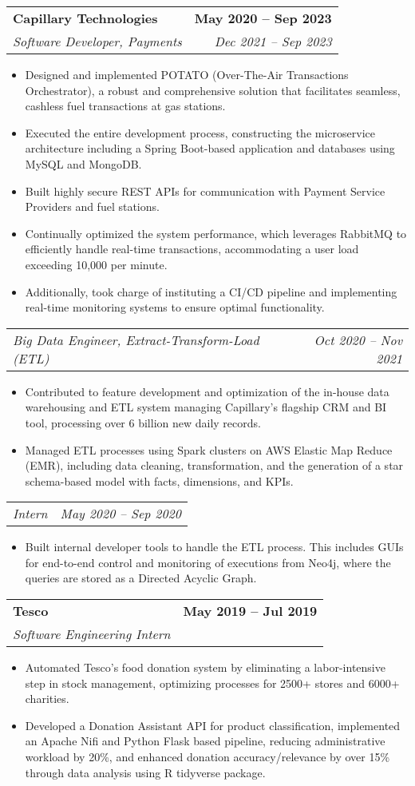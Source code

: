 \documentclass[letterpaper,11pt]{article}
\makeatletter
\newcommand{\resumeItem}[1]{
  \item\small{
    {#1 \vspace{-2pt}}
  }
}
\newcommand{\resumeSubheading}[4]{
  \vspace{-2pt}\item
    \begin{tabular*}{1.0\textwidth}[t]{l@{\extracolsep{\fill}}r}
      \textbf{#1} & \textbf{\small #2} \\
      \textit{\small#3} & \textit{\small #4} \\
    \end{tabular*}\vspace{-7pt}
}
\newcommand{\resumeSubSubheading}[2]{
    \item
    \begin{tabular*}{1.0\textwidth}{l@{\extracolsep{\fill}}r}
      \textit{\small#1} & \textit{\small #2} \\
    \end{tabular*}\vspace{-7pt}
}
\newcommand{\resumeItemListStart}{\begin{itemize}}
\newcommand{\resumeItemListEnd}{\end{itemize}\vspace{-5pt}}
\makeatother
\begin{document}
    \resumeSubheading
      {Capillary Technologies}{May 2020 -- Sep 2023}
      {Software Developer, Payments}{Dec 2021 -- Sep 2023}
      \resumeItemListStart
        \resumeItem{
        Designed and implemented POTATO (Over-The-Air Transactions Orchestrator), a robust and comprehensive solution that facilitates seamless, cashless fuel transactions at gas stations.
        }
        \resumeItem{
        Executed the entire development process, constructing the microservice architecture including a Spring Boot-based application and databases using MySQL and MongoDB.
        }
        \resumeItem{
        Built highly secure REST APIs for communication with Payment Service Providers and fuel stations.
        }
        \resumeItem{
        Continually optimized the system performance, which leverages RabbitMQ to efficiently handle real-time transactions, accommodating a user load exceeding 10,000 per minute.
        }
        \resumeItem{
        Additionally, took charge of instituting a CI/CD pipeline and implementing real-time monitoring systems to ensure optimal functionality.
        }
      \resumeItemListEnd
    \resumeSubSubheading
      {Big Data Engineer, Extract-Transform-Load (ETL)}{Oct 2020 -- Nov 2021}
      \resumeItemListStart
        \resumeItem{Contributed to feature development and optimization of the in-house data warehousing and ETL system managing Capillary’s flagship CRM and BI tool, processing over 6 billion new daily records.}
        \resumeItem{Managed ETL processes using Spark clusters on AWS Elastic Map Reduce (EMR), including data cleaning, transformation, and the generation of a star schema-based model with facts, dimensions, and KPIs.}
      \resumeItemListEnd
    \resumeSubSubheading
      {Intern}{May 2020 -- Sep 2020}
      \resumeItemListStart
        \resumeItem{Built internal developer tools to handle the ETL process. This includes GUIs for end-to-end control and monitoring of executions from Neo4j, where the queries are stored as a Directed Acyclic Graph.}
      \resumeItemListEnd

\pagebreak \vspace*{30pt}

    \resumeSubheading
      {Tesco}{May 2019 -- Jul 2019}
      {Software Engineering Intern}{}
      \resumeItemListStart
        \resumeItem{Automated Tesco's food donation system by eliminating a labor-intensive step in stock management, optimizing processes for 2500+ stores and 6000+ charities.
        }
        \resumeItem{Developed a Donation Assistant API for product classification, implemented an Apache Nifi and Python Flask based pipeline, reducing administrative workload by 20\%, and enhanced donation accuracy/relevance by over 15\% through data analysis using R tidyverse package.
        }
    \resumeItemListEnd
\end{document}
